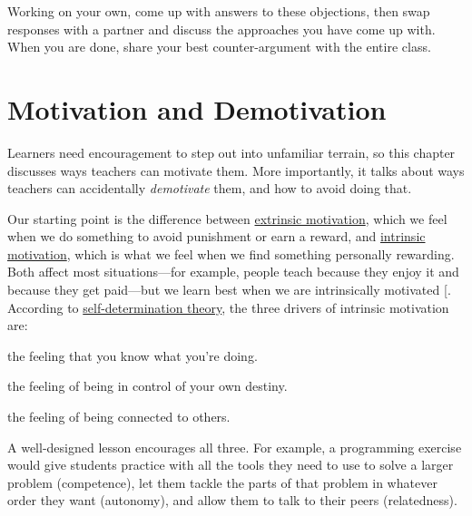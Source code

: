 Working on your own, come up with answers to these objections, then swap
responses with a partner and discuss the approaches you have come up
with. When you are done, share your best counter-argument with the
entire class.

\chapter{Motivation and Demotivation}\label{s:motivation}

Learners need encouragement to step out into unfamiliar terrain, so this
chapter discusses ways teachers can motivate them. More importantly, it
talks about ways teachers can accidentally \emph{demotivate} them, and how to
avoid doing that.

Our starting point is the difference between \protect\hyperlink{g:extrinsic-motivation}{extrinsic
motivation}, which we feel when we do
something to avoid punishment or earn a reward, and \protect\hyperlink{g:intrinsic-motivation}{intrinsic
motivation}, which is what we feel when we
find something personally rewarding. Both affect most situations---for
example, people teach because they enjoy it and because they get
paid---but we learn best when we are intrinsically motivated
{[}\protect[\hyperlink{b:Wlod2017}{Wlod2017}]{]}. According to \href{https://en.wikipedia.org/wiki/Self-determination_theory}{self-determination
theory}, the three drivers of intrinsic
motivation are:

\begin{description}
\tightlist
\item[Competence:]
the feeling that you know what you're doing.
\item[Autonomy:]
the feeling of being in control of your own destiny.
\item[Relatedness:]
the feeling of being connected to others.
\end{description}

A well-designed lesson encourages all three. For example, a programming
exercise would give students practice with all the tools they need to
use to solve a larger problem (competence), let them tackle the parts of
that problem in whatever order they want (autonomy), and allow them to
talk to their peers (relatedness).

